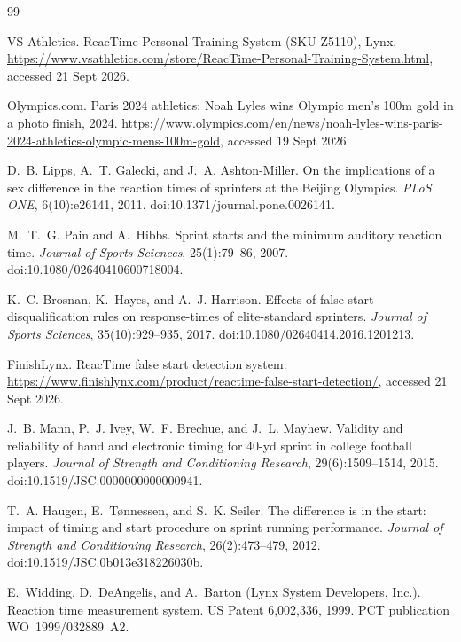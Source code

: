 \documentclass[9pt,a4paper]{extarticle}
\begin{document}
\clearpage
{\small
\begin{thebibliography}{99}\setlength{\itemsep}{0pt}

 VS Athletics.
\newblock ReacTime Personal Training System (SKU Z5110), Lynx.
\newblock \url{https://www.vsathletics.com/store/ReacTime-Personal-Training-System.html}, accessed 21 Sept 2026.

 Olympics.com.
\newblock Paris 2024 athletics: Noah Lyles wins Olympic men's 100m gold in a photo finish, 2024.
\newblock \url{https://www.olympics.com/en/news/noah-lyles-wins-paris-2024-athletics-olympic-mens-100m-gold}, accessed 19 Sept 2026.

 D.~B. Lipps, A.~T. Galecki, and J.~A. Ashton-Miller.
\newblock On the implications of a sex difference in the reaction times of sprinters at the Beijing Olympics.
\newblock \emph{PLoS ONE}, 6(10):e26141, 2011.
\newblock doi:10.1371/journal.pone.0026141.

 M.~T.~G. Pain and A.~Hibbs.
\newblock Sprint starts and the minimum auditory reaction time.
\newblock \emph{Journal of Sports Sciences}, 25(1):79--86, 2007.
\newblock doi:10.1080/02640410600718004.

 K.~C. Brosnan, K.~Hayes, and A.~J. Harrison.
\newblock Effects of false-start disqualification rules on response-times of elite-standard sprinters.
\newblock \emph{Journal of Sports Sciences}, 35(10):929--935, 2017.
\newblock doi:10.1080/02640414.2016.1201213.

 FinishLynx.
\newblock ReacTime false start detection system.
\newblock \url{https://www.finishlynx.com/product/reactime-false-start-detection/}, accessed 21 Sept 2026.

 J.~B. Mann, P.~J. Ivey, W.~F. Brechue, and J.~L. Mayhew.
\newblock Validity and reliability of hand and electronic timing for 40-yd sprint in college football players.
\newblock \emph{Journal of Strength and Conditioning Research}, 29(6):1509--1514, 2015.
\newblock doi:10.1519/JSC.0000000000000941.

 T.~A. Haugen, E.~T{\o}nnessen, and S.~K. Seiler.
\newblock The difference is in the start: impact of timing and start procedure on sprint running performance.
\newblock \emph{Journal of Strength and Conditioning Research}, 26(2):473--479, 2012.
\newblock doi:10.1519/JSC.0b013e318226030b.

 E.~Widding, D.~DeAngelis, and A.~Barton (Lynx System Developers, Inc.).
\newblock Reaction time measurement system.
\newblock US Patent 6,002,336, 1999. PCT publication WO~1999/032889~A2.


\end{thebibliography}}
\end{document}
